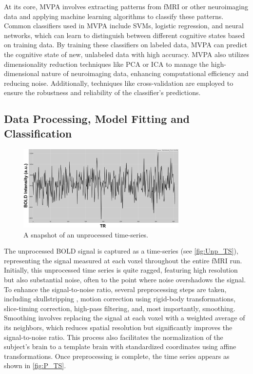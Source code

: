 At its core, \gls{MVPA} involves extracting patterns from \gls{fMRI} or other neuroimaging data and applying machine learning algorithms to classify these patterns. Common classifiers used in \gls{MVPA} include \gls{SVMs}, logistic regression, and neural networks, which can learn to distinguish between different cognitive states based on training data. By training these classifiers on labeled data, \gls{MVPA} can predict the cognitive state of new, unlabeled data with high accuracy. \gls{MVPA} also utilizes dimensionality reduction techniques like \gls{PCA} or \gls{ICA} to manage the high-dimensional nature of neuroimaging data, enhancing computational efficiency and reducing noise. Additionally, techniques like cross-validation are employed to ensure the robustness and reliability of the classifier’s predictions.

\clearpage

\subsection{Data Processing, Model Fitting and Classification}

\begin{figure}[htbp]
    \centering
    \includegraphics[width = 0.75\textwidth]{assets/images/unproc.png}
    \caption[Unprocessed Time-Series]{A snapshot of an unprocessed time-series.}
    \label{fig:Unp_TS}
\end{figure}

The unprocessed \gls{BOLD} signal is captured as a time-series (see \autoref{fig:Unp_TS}), representing the signal measured at each voxel throughout the entire \gls{fMRI} run. Initially, this unprocessed time series is quite ragged, featuring high resolution but also substantial noise, often to the point where noise overshadows the signal. To enhance the signal-to-noise ratio, several preprocessing steps are taken, including skullstripping \cite{Smith2002}, motion correction using rigid-body transformations, slice-timing correction, high-pass filtering, and, most importantly, smoothing. Smoothing involves replacing the signal at each voxel with a weighted average of its neighbors, which reduces spatial resolution but significantly improves the signal-to-noise ratio. This process also facilitates the normalization of the subject's brain to a template brain with standardized coordinates using affine transformations. Once preprocessing is complete, the time series appears as shown in \autoref{fig:P_TS}.

